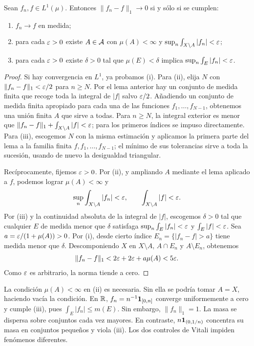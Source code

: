 \begin{teorema}\label{teo:v2-vitali-L1}
Sean $f_n,f\in L^1(\mu)$. Entonces $\|f_n-f\|_1\to0$ si y sólo si se cumplen:
\begin{enumerate}
\item $f_n\to f$ en medida;
\item para cada $\varepsilon>0$ existe $A\in\mathcal A$ con $\mu(A)<\infty$ y $\sup_n\int_{X\setminus A}|f_n|<\varepsilon$;
\item para cada $\varepsilon>0$ existe $\delta>0$ tal que $\mu(E)<\delta$ implica $\sup_n\int_E|f_n|<\varepsilon$.
\end{enumerate}
\end{teorema}
\begin{proof}
Si hay convergencia en $L^1$, ya probamos (i). Para (ii), elija $N$ con $\|f_n-f\|_1<\varepsilon/2$ para $n\ge N$. Por el lema anterior hay un conjunto de medida finita que recoge toda la integral de $|f|$ salvo $\varepsilon/2$. Añadiendo un conjunto de medida finita apropiado para cada una de las funciones $f_1,\ldots,f_{N-1}$, obtenemos una unión finita $A$ que sirve a todas. Para $n\ge N$, la integral exterior es menor que $\|f_n-f\|_1+\int_{X\setminus A}|f|<\varepsilon$; para los primeros índices se impuso directamente. Para (iii), escogemos $N$ con la misma estimación y aplicamos la primera parte del lema a la familia finita $f,f_1,\ldots,f_{N-1}$; el mínimo de sus tolerancias sirve a toda la sucesión, usando de nuevo la desigualdad triangular.

Recíprocamente, fijemos $\varepsilon>0$. Por (ii), y ampliando $A$ mediante el lema aplicado a $f$, podemos lograr $\mu(A)<\infty$ y
\[\sup_n\int_{X\setminus A}|f_n|<\varepsilon,\qquad \int_{X\setminus A}|f|<\varepsilon.
\]
Por (iii) y la continuidad absoluta de la integral de $|f|$, escogemos $\delta>0$ tal que cualquier $E$ de medida menor que $\delta$ satisfaga $\sup_n\int_E|f_n|<\varepsilon$ y $\int_E|f|<\varepsilon$. Sea $a=\varepsilon/(1+\mu(A))>0$. Por (i), desde cierto índice $E_n=\{|f_n-f|>a\}$ tiene medida menor que $\delta$. Descomponiendo $X$ en $X\setminus A$, $A\cap E_n$ y $A\setminus E_n$, obtenemos
\[\|f_n-f\|_1<2\varepsilon+2\varepsilon+a\mu(A)<5\varepsilon.
\]
Como $\varepsilon$ es arbitrario, la norma tiende a cero.
\end{proof}
\begin{observacion}
La condición $\mu(A)<\infty$ en (ii) es necesaria. Sin ella se podría tomar $A=X$, haciendo vacía la condición. En $\mathbb R$, $f_n=n^{-1}\mathbf1_{[0,n]}$ converge uniformemente a cero y cumple (iii), pues $\int_E|f_n|\le m(E)$. Sin embargo, $\|f_n\|_1=1$. La masa se dispersa sobre conjuntos cada vez mayores. En contraste, $n\mathbf1_{(0,1/n)}$ concentra su masa en conjuntos pequeños y viola (iii). Los dos controles de Vitali impiden fenómenos diferentes.
\end{observacion}

